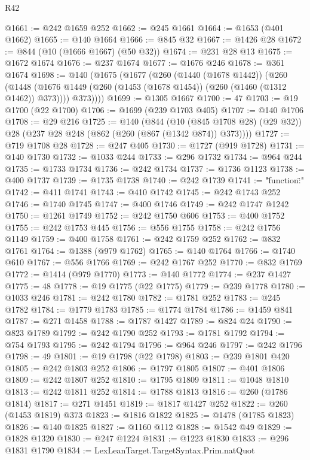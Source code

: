 \begin{lexlean}{R42}
\begin{coremodule}
@1661 := @242 @1659 @252
@1662 := @245 @1661
@1664 := @1653 (@401 @1662)
@1665 := @140 @1664
@1666 := @845 @32
@1667 := @1426 @28
@1672 := @844 (@10 (@1666 @1667) (@50 @32))
@1674 := @231 @28 @13
@1675 := @1672 @1674
@1676 := @237 @1674
@1677 := @1676 @246
@1678 := @361 @1674
@1698 := @140
    (@1675
      (@1677
        (@260
          (@1440 (@1678 @1442))
          (@260
            (@1448 (@1676 @1449 (@260 (@1453 (@1678 @1454)) (@260 (@1460 (@1312 @1462)) @373))))
            @373))))
@1699 := @1305 @1667
@1700 := 47
@1703 := @19 @1700 (@22 @1700)
@1706 := @1699 (@239 @1703 @405)
@1707 := @140 @1706
@1708 := @29 @216
@1725 := @140
    (@844
      (@10 (@845 @1708 @28) (@29 @32))
      @28
      (@237 @28 @248 (@862 (@260 (@867 (@1342 @874)) @373))))
@1727 := @719 @1708 @28
@1728 := @247 @405
@1730 := @1727 (@919 @1728)
@1731 := @140 @1730
@1732 := @1033 @244
@1733 := @296 @1732
@1734 := @964 @244
@1735 := @1733 @1734
@1736 := @242 @1734
@1737 := @1736 @1123
@1738 := @400 @1737
@1739 := @1735 @1738
@1740 := @242 @1739
@1741 := "{\"function\":"
@1742 := @411 @1741
@1743 := @410 @1742
@1745 := @242 @1743 @252
@1746 := @1740 @1745
@1747 := @400 @1746
@1749 := @242 @1747 @1242
@1750 := @1261 @1749
@1752 := @242 @1750 @606
@1753 := @400 @1752
@1755 := @242 @1753 @445
@1756 := @556 @1755
@1758 := @242 @1756 @1149
@1759 := @400 @1758
@1761 := @242 @1759 @252
@1762 := @832 @1761
@1764 := @1388 (@979 @1762)
@1765 := @140 @1764
@1766 := @1740 @610
@1767 := @556 @1766
@1769 := @242 @1767 @252
@1770 := @832 @1769
@1772 := @1414 (@979 @1770)
@1773 := @140 @1772
@1774 := @237 @1427
@1775 := 48
@1778 := @19 @1775 (@22 @1775)
@1779 := @239 @1778
@1780 := @1033 @246
@1781 := @242 @1780
@1782 := @1781 @252
@1783 := @245 @1782
@1784 := @1779 @1783
@1785 := @1774 @1784
@1786 := @1459 @841
@1787 := @271 @1458
@1788 := @1787 @1427
@1789 := @824 @24
@1790 := @823 @1789
@1792 := @242 @1790 @252
@1793 := @1781 @1792
@1794 := @754 @1793
@1795 := @242 @1794
@1796 := @964 @246
@1797 := @242 @1796
@1798 := 49
@1801 := @19 @1798 (@22 @1798)
@1803 := @239 @1801 @420
@1805 := @242 @1803 @252
@1806 := @1797 @1805
@1807 := @401 @1806
@1809 := @242 @1807 @252
@1810 := @1795 @1809
@1811 := @1048 @1810
@1813 := @242 @1811 @252
@1814 := @1788 @1813
@1816 := @260 (@1786 @1814)
@1817 := @271 @1451
@1819 := @1817 @1427 @252
@1822 := @260 (@1453 @1819) @373
@1823 := @1816 @1822
@1825 := @1478 (@1785 @1823)
@1826 := @140 @1825
@1827 := @1160 @112
@1828 := @1542 @49
@1829 := @1828 @1320
@1830 := @247 @1224
@1831 := @1223 @1830
@1833 := @296 @1831 @1790
@1834 := LexLeanTarget.TargetSyntax.Prim.natQuot
}
\end{coremodule}
\end{lexlean}
